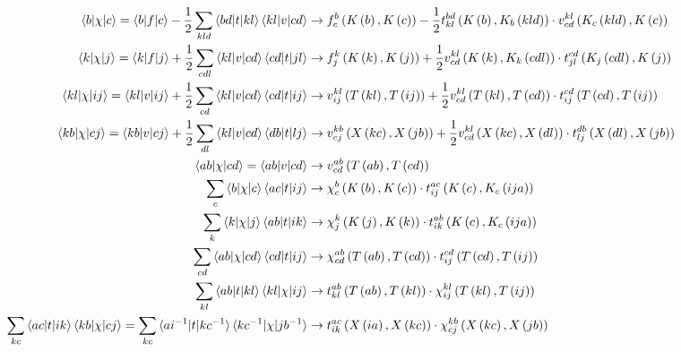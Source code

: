 \begin{align}
\braket{b| \chi |c} = \braket{b|f|c} - \frac{1}{2} \sum_{kld} \braket{bd|t|kl} \braket{kl|v|cd} &\rightarrow f_{c}^{b}\left( K\left( b\right),K\left( c\right)\right) - \frac{1}{2}t_{kl}^{bd}\left( K\left( b\right),K_{b}\left( kld\right)\right)\cdot v_{cd}^{kl}\left( K_{c}\left( kld\right),K\left( c\right)\right) \\
\braket{k| \chi |j} = \braket{k|f|j} + \frac{1}{2} \sum_{cdl} \braket{kl|v|cd} \braket{cd|t|jl} &\rightarrow f_{j}^{k}\left( K\left( k\right),K\left( j\right)\right) + \frac{1}{2}v_{cd}^{kl}\left( K\left( k\right),K_{k}\left( cdl\right)\right)\cdot t_{jl}^{cd}\left( K_{j}\left( cdl\right),K\left( j\right)\right) \\
\braket{kl| \chi |ij} = \braket{kl|v|ij} + \frac{1}{2} \sum_{cd} \braket{kl|v|cd} \braket{cd|t|ij} &\rightarrow v_{ij}^{kl}\left( T\left( kl\right),T\left( ij\right)\right) + \frac{1}{2}v_{cd}^{kl}\left( T\left( kl\right),T\left( cd\right)\right)\cdot t_{ij}^{cd}\left( T\left( cd\right),T\left( ij\right)\right) \\
\braket{kb| \chi |cj} = \braket{kb|v|cj} + \frac{1}{2} \sum_{dl} \braket{kl|v|cd} \braket{db|t|lj} &\rightarrow v_{cj}^{kb}\left( X\left( kc\right),X\left( jb\right)\right) + \frac{1}{2}v_{cd}^{kl}\left( X\left( kc\right),X\left( dl\right)\right)\cdot t_{lj}^{db}\left( X\left( dl\right),X\left( jb\right)\right) \\
\braket{ab| \chi |cd} = \braket{ab|v|cd} &\rightarrow v_{cd}^{ab}\left( T\left( ab\right),T\left( cd\right)\right) \\
\sum_{c} \braket{b| \chi |c} \braket{ac| t |ij} &\rightarrow \chi_{c}^{b}\left( K\left( b\right),K\left( c\right)\right)\cdot t_{ij}^{ac}\left( K\left( c\right), K_{c}\left( ija\right)\right) \\
\sum_{k} \braket{k| \chi |j} \braket{ab| t |ik} &\rightarrow \chi_{j}^{k}\left( K\left( j\right),K\left( k\right)\right)\cdot t_{ik}^{ab}\left( K\left( c\right), K_{c}\left( ija\right)\right) \\
\sum_{cd} \braket{ab| \chi |cd} \braket{cd| t |ij} &\rightarrow \chi_{cd}^{ab}\left( T\left( ab\right),T\left( cd\right)\right)\cdot t_{ij}^{cd}\left( T\left( cd\right),T\left( ij\right)\right) \\
\sum_{kl} \braket{ab| t |kl} \braket{kl| \chi |ij} &\rightarrow t_{kl}^{ab}\left( T\left( ab\right),T\left( kl\right)\right)\cdot \chi_{ij}^{kl}\left( T\left( kl\right),T\left( ij\right)\right) \\ 
\sum_{kc} \braket{ac| t |ik}\braket{kb| \chi |cj} = \sum_{kc} \braket{ai^{-1}| t |kc^{-1}}\braket{kc^{-1}| \chi |jb^{-1}} &\rightarrow t_{ik}^{ac}\left( X\left( ia\right),X\left( kc\right)\right)\cdot \chi_{cj}^{kb}\left( X\left( kc\right),X\left( jb\right)\right)
\end{align}

